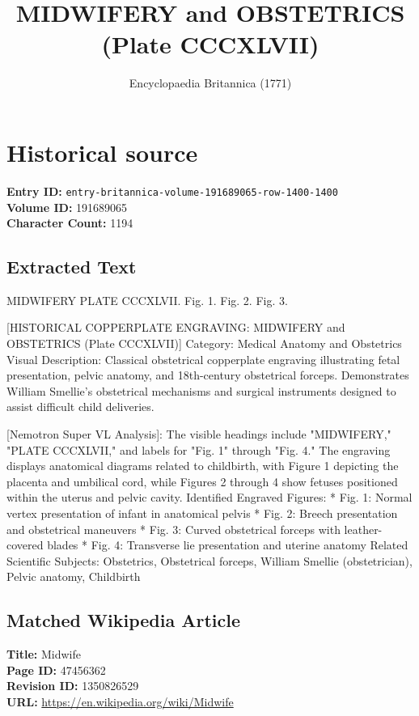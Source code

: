 \documentclass{article}
\title{MIDWIFERY and OBSTETRICS (Plate CCCXLVII)}
\date{Encyclopaedia Britannica (1771)}
\begin{document}
\maketitle

\section*{Historical source}
\textbf{Entry ID:} \texttt{entry-britannica-volume-191689065-row-1400-1400} \\
\textbf{Volume ID:} 191689065 \\
\textbf{Character Count:} 1194

\subsection*{Extracted Text}
MIDWIFERY PLATE CCCXLVII.
Fig. 1.
Fig. 2.
Fig. 3.

[HISTORICAL COPPERPLATE ENGRAVING: MIDWIFERY and OBSTETRICS (Plate CCCXLVII)]
Category: Medical Anatomy and Obstetrics
Visual Description: Classical obstetrical copperplate engraving illustrating fetal presentation, pelvic anatomy, and 18th-century obstetrical forceps. Demonstrates William Smellie's obstetrical mechanisms and surgical instruments designed to assist difficult child deliveries.

[Nemotron Super VL Analysis]: The visible headings include "MIDWIFERY," "PLATE CCCXLVII," and labels for "Fig. 1" through "Fig. 4." The engraving displays anatomical diagrams related to childbirth, with Figure 1 depicting the placenta and umbilical cord, while Figures 2 through 4 show fetuses positioned within the uterus and pelvic cavity.
Identified Engraved Figures:
  * Fig. 1: Normal vertex presentation of infant in anatomical pelvis
  * Fig. 2: Breech presentation and obstetrical maneuvers
  * Fig. 3: Curved obstetrical forceps with leather-covered blades
  * Fig. 4: Transverse lie presentation and uterine anatomy
Related Scientific Subjects: Obstetrics, Obstetrical forceps, William Smellie (obstetrician), Pelvic anatomy, Childbirth

\subsection*{Matched Wikipedia Article}
\textbf{Title:} Midwife \\
\textbf{Page ID:} 47456362 \\
\textbf{Revision ID:} 1350826529 \\
\textbf{URL:} \url{https://en.wikipedia.org/wiki/Midwife}
\end{document}
